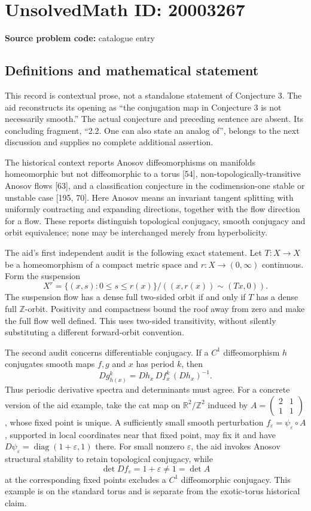 \documentclass[11pt]{article}
\newcommand{\Z}{\mathbb{Z}}
\newcommand{\R}{\mathbb{R}}
\newcommand{\eps}{\varepsilon}
\begin{document}
\section*{UnsolvedMath ID: 20003267}
\textbf{Source problem code:} catalogue entry
\subsection{Definitions and mathematical statement}
This record is contextual prose, not a standalone statement of Conjecture 3. The aid reconstructs its opening as ``the conjugation map in Conjecture 3 is not necessarily smooth.'' The actual conjecture and preceding sentence are absent. Its concluding fragment, ``2.2. One can also state an analog of'', belongs to the next discussion and supplies no complete additional assertion.

The historical context reports Anosov diffeomorphisms on manifolds homeomorphic but not diffeomorphic to a torus [54], non-topologically-transitive Anosov flows [63], and a classification conjecture in the codimension-one stable or unstable case [195, 70]. Here Anosov means an invariant tangent splitting with uniformly contracting and expanding directions, together with the flow direction for a flow. These reports distinguish topological conjugacy, smooth conjugacy and orbit equivalence; none may be interchanged merely from hyperbolicity.

The aid's first independent audit is the following exact statement. Let $T:X\to X$ be a homeomorphism of a compact metric space and $r:X\to(0,\infty)$ continuous. Form the suspension
\[
X^r=\{(x,s):0\leq s\leq r(x)\}/((x,r(x))\sim(Tx,0)).
\]
The suspension flow has a dense full two-sided orbit if and only if $T$ has a dense full $\Z$-orbit. Positivity and compactness bound the roof away from zero and make the full flow well defined. This uses two-sided transitivity, without silently substituting a different forward-orbit convention.

The second audit concerns differentiable conjugacy. If a $C^1$ diffeomorphism $h$ conjugates smooth maps $f,g$ and $x$ has period $k$, then
\[
Dg^k_{h(x)}=Dh_x\,Df^k_x\,(Dh_x)^{-1}.
\]
Thus periodic derivative spectra and determinants must agree. For a concrete version of the aid example, take the cat map on $\R^2/\Z^2$ induced by $A=\begin{pmatrix}2&1\\1&1\end{pmatrix}$, whose fixed point is unique. A sufficiently small smooth perturbation $f_\eps=\psi_\eps\circ A$, supported in local coordinates near that fixed point, may fix it and have $D\psi_\eps=\operatorname{diag}(1+\eps,1)$ there. For small nonzero $\eps$, the aid invokes Anosov structural stability to retain topological conjugacy, while
\[
\det Df_\eps=1+\eps\ne1=\det A
\]
at the corresponding fixed points excludes a $C^1$ diffeomorphic conjugacy. This example is on the standard torus and is separate from the exotic-torus historical claim.
\end{document}
